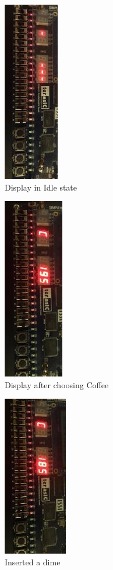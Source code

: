 \documentclass[12pt]{article}
\begin{document}
\begin{figure}[H]
\begin{center}
\includegraphics[scale=1.0,angle=90]{----.png}
\caption{Display in Idle state}
\label{fig:board1}
\end{center}
\end{figure}

\begin{figure}[H]
\begin{center}
\includegraphics[scale=1.0,angle=90]{C195.png}
\caption{Display after choosing Coffee}
\label{fig:board2}
\end{center}
\end{figure}

\begin{figure}[H]
\begin{center}
\includegraphics[scale=1.0,angle=90]{C185.png}
\caption{Inserted a dime}
\label{fig:board3}
\end{center}
\end{figure}
\end{document}
